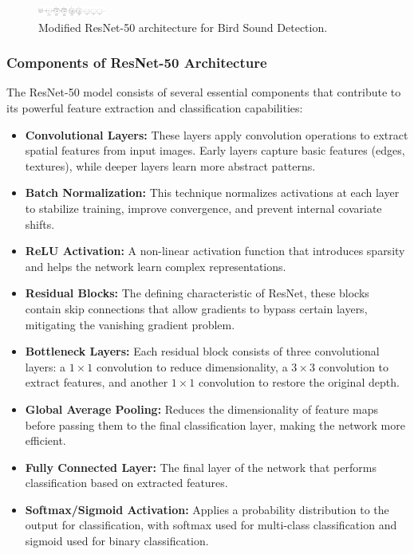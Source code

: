       \begin{figure}[h!]
      \centering
      \includegraphics[angle=270,width=0.2\textwidth]{images/MajorProject-resnet architecture.png}
      \caption{Modified ResNet-50 architecture for Bird Sound Detection.}
      \label{fig:resnet50}
      \end{figure}
      \newpage

      \subsubsection{Components of ResNet-50 Architecture}
      The ResNet-50 model consists of several essential components that contribute to its powerful feature extraction and classification capabilities:

      \begin{itemize}
            \item \textbf{Convolutional Layers:} These layers apply convolution operations to extract spatial features from input images. Early layers capture basic features (edges, textures), while deeper layers learn more abstract patterns.
      
            \item \textbf{Batch Normalization:} This technique normalizes activations at each layer to stabilize training, improve convergence, and prevent internal covariate shifts.
      
            \item \textbf{ReLU Activation:} A non-linear activation function that introduces sparsity and helps the network learn complex representations.
      
            \item \textbf{Residual Blocks:} The defining characteristic of ResNet, these blocks contain skip connections that allow gradients to bypass certain layers, mitigating the vanishing gradient problem.
      
            \item \textbf{Bottleneck Layers:} Each residual block consists of three convolutional layers: a \(1\times1\) convolution to reduce dimensionality, a \(3\times3\) convolution to extract features, and another \(1\times1\) convolution to restore the original depth.
      
            \item \textbf{Global Average Pooling:} Reduces the dimensionality of feature maps before passing them to the final classification layer, making the network more efficient.
      
            \item \textbf{Fully Connected Layer:} The final layer of the network that performs classification based on extracted features.
      
            \item \textbf{Softmax/Sigmoid Activation:} Applies a probability distribution to the output for classification, with softmax used for multi-class classification and sigmoid used for binary classification.
      \end{itemize}

